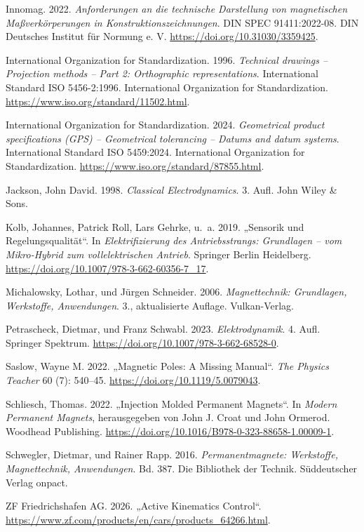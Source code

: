 \documentclass[
  ngerman,
  a4paper,
  twoside]{scrbook}
\newlength{\cslhangindent}
\newenvironment{CSLReferences}[2] %
 {\begin{list}{}{%
  \setlength{\itemindent}{0pt}
  \setlength{\leftmargin}{0pt}
  \setlength{\parsep}{0pt}
  \ifodd #1
   \setlength{\leftmargin}{\cslhangindent}
   \setlength{\itemindent}{-1\cslhangindent}
  \fi
  \setlength{\itemsep}{#2\baselineskip}}}
 {\end{list}}
\begin{document}
\begin{CSLReferences}{1}{1}
Innomag. 2022. \emph{Anforderungen an die technische Darstellung von
magnetischen Maßverkörperungen in Konstruktionszeichnungen}. DIN SPEC
91411:2022-08. DIN Deutsches Institut für Normung e. V.
\url{https://doi.org/10.31030/3359425}.

International Organization for Standardization. 1996. \emph{{Technical
drawings -- Projection methods -- Part 2: Orthographic
representations}}. International Standard ISO 5456-2:1996. International
Organization for Standardization.
\url{https://www.iso.org/standard/11502.html}.

International Organization for Standardization. 2024. \emph{{Geometrical
product specifications (GPS) -- Geometrical tolerancing -- Datums and
datum systems}}. International Standard ISO 5459:2024. International
Organization for Standardization.
\url{https://www.iso.org/standard/87855.html}.

Jackson, John David. 1998. \emph{Classical Electrodynamics}. 3. Aufl.
John Wiley \& Sons.

Kolb, Johannes, Patrick Roll, Lars Gehrke, u.~a. 2019. {„Sensorik und
Regelungsqualität``}. In \emph{Elektrifizierung des Antriebsstrangs:
Grundlagen -- vom Mikro-Hybrid zum vollelektrischen Antrieb}. Springer
Berlin Heidelberg. \url{https://doi.org/10.1007/978-3-662-60356-7_17}.

Michalowsky, Lothar, und Jürgen Schneider. 2006. \emph{Magnettechnik:
Grundlagen, Werkstoffe, Anwendungen}. 3., aktualisierte Auflage.
Vulkan-Verlag.

Petrascheck, Dietmar, und Franz Schwabl. 2023. \emph{Elektrodynamik}. 4.
Aufl. Springer Spektrum.
\url{https://doi.org/10.1007/978-3-662-68528-0}.

Saslow, Wayne M. 2022. {„Magnetic Poles: A Missing Manual``}. \emph{The
Physics Teacher} 60 (7): 540--45.
\url{https://doi.org/10.1119/5.0079043}.

Schliesch, Thomas. 2022. {„Injection Molded Permanent Magnets``}. In
\emph{Modern Permanent Magnets}, herausgegeben von John J. Croat und
John Ormerod. Woodhead Publishing.
\url{https://doi.org/10.1016/B978-0-323-88658-1.00009-1}.

Schwegler, Dietmar, und Rainer Rapp. 2016. \emph{Permanentmagnete:
Werkstoffe, Magnettechnik, Anwendungen}. Bd. 387. Die Bibliothek der
Technik. Süddeutscher Verlag onpact.

ZF Friedrichshafen AG. 2026. {„Active Kinematics Control``}.
\url{https://www.zf.com/products/en/cars/products_64266.html}.

\end{CSLReferences}


\backmatter
\end{document}

